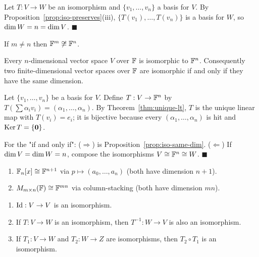 \begin{proofbox}
Let $T:V\to W$ be an isomorphism and $\{v_1,\ldots,v_n\}$ a basis for $V$.
By Proposition~\ref{prop:iso-preserves}(iii), $\{T(v_1),\ldots,T(v_n)\}$ is a
basis for $W$, so $\operatorname{dim} W=n=\operatorname{dim} V$.
\hfill$\blacksquare$
\end{proofbox}

\begin{corbox}
\label{cor:Fm-Fn-not-iso}
If $m\ne n$ then $\mathbb{F}^m\not\cong\mathbb{F}^n$.
\end{corbox}

\begin{thmbox}
\label{thm:iso-Fn}
Every $n$-dimensional vector space $V$ over $\mathbb{F}$ is isomorphic to $\mathbb{F}^n$.
Consequently two finite-dimensional vector spaces over $\mathbb{F}$ are isomorphic if
and only if they have the same dimension.
\end{thmbox}

\begin{proofbox}
Let $\{v_1,\ldots,v_n\}$ be a basis for $V$.  Define
$T:V\to\mathbb{F}^n$ by $T(\sum\alpha_i v_i)=(\alpha_1,\ldots,\alpha_n)$.  By
Theorem~\ref{thm:unique-lt}, $T$ is the unique linear map with
$T(v_i)=e_i$; it is bijective because every $(\alpha_1,\ldots,\alpha_n)$ is
hit and $\operatorname{Ker} T=\{\mathbf{0}\}$.

For the "if and only if": ($\Rightarrow$) is Proposition~\ref{prop:iso-same-dim}.
($\Leftarrow$) If $\operatorname{dim} V=\operatorname{dim} W=n$, compose the isomorphisms $V\cong\mathbb{F}^n\cong W$.
\hfill$\blacksquare$
\end{proofbox}

\begin{exbox}
\begin{enumerate}
    \item $\mathbb{F}_n[x]\cong\mathbb{F}^{n+1}$ via $p\mapsto(a_0,\ldots,a_n)$ (both have
          dimension $n+1$).
    \item $M_{m\times n}(\mathbb{F})\cong\mathbb{F}^{mn}$ via column-stacking (both have dimension $mn$).
\end{enumerate}
\end{exbox}

\begin{tipbox}
\begin{enumerate}[label=(\roman*)]
    \item $\mathrm{Id}:V\to V$ is an isomorphism.
    \item If $T:V\to W$ is an isomorphism, then $T^{-1}:W\to V$ is also an
          isomorphism.
    \item If $T_1:V\to W$ and $T_2:W\to Z$ are isomorphisms, then $T_2\circ T_1$
          is an isomorphism.
\end{enumerate}
\end{tipbox}

